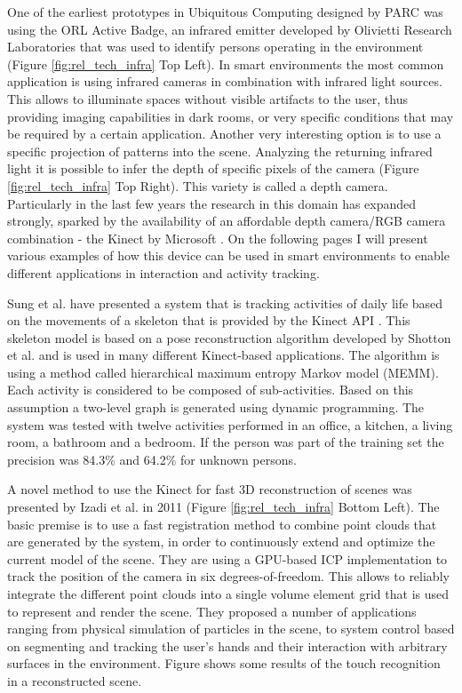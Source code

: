 One of the earliest prototypes in Ubiquitous Computing designed by PARC was using the ORL Active Badge, an infrared emitter developed by Olivietti Research Laboratories that was used to identify persons operating in the environment \cite{Weiser1991} (Figure \ref{fig:rel_tech_infra} Top Left). In smart environments the most common application is using infrared cameras in combination with infrared light sources. This allows to illuminate spaces without visible artifacts to the user, thus providing imaging capabilities in dark rooms, or very specific conditions that may be required by a certain application. Another very interesting option is to use a specific projection of patterns into the scene. Analyzing the returning infrared light it is possible to infer the depth of specific pixels of the camera (Figure \ref{fig:rel_tech_infra} Top Right). This variety is called a depth camera. Particularly in the last few years the research in this domain has expanded strongly, sparked by the availability of an affordable depth camera/RGB camera combination - the Kinect by Microsoft \cite{zhang2012microsoft}. On the following pages I will present various examples of how this device can be used in smart environments to enable different applications in interaction and activity tracking.

Sung et al. have presented a system that is tracking activities of daily life based on the movements of a skeleton that is provided by the Kinect API \cite{sung2011human}. This skeleton model is based on a pose reconstruction algorithm developed by Shotton et al. \cite{Shotton2013} and is used in many different Kinect-based applications. The algorithm is using a method called hierarchical maximum entropy Markov model (MEMM). Each activity is considered to be composed of sub-activities. Based on this assumption a two-level graph is generated using dynamic programming. The system was tested with twelve activities performed in an office, a kitchen, a living room, a bathroom and a bedroom. If the person was part of the training set the precision was 84.3\% and 64.2\% for unknown persons. 

A novel method to use the Kinect for fast 3D reconstruction of scenes was presented by Izadi et al. in 2011 \cite{Izadi2011} (Figure \ref{fig:rel_tech_infra} Bottom Left). The basic premise is to use a fast registration method to combine point clouds that are generated by the system, in order to continuously extend and optimize the current model of the scene. They are using a GPU-based ICP implementation to track the position of the camera in six degrees-of-freedom. This allows to reliably integrate the different point clouds into a single volume element grid that is used to represent and render the scene. They proposed a number of applications ranging from physical simulation of particles in the scene, to system control based on segmenting and tracking the user's hands and their interaction with arbitrary surfaces in the environment. Figure  shows some results of the touch recognition in a reconstructed scene.

